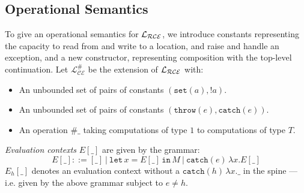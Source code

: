 \documentclass{eptcs}
\newcommand{\throw}{{\mathtt{throw}}}
\newcommand{\set}{{\mathtt{set}}}
\newcommand{\lett}{{\mathtt{let}}}
\newcommand{\spc}{\hspace{2pt}}
\newcommand{\Lce}{{\cal{L_{RCE}}}}
\newcommand{\catch}{{\mathtt{catch}}}
\newcommand{\com}{{{1}}}
\newcommand{\inn}{{{\mathtt{in}}}}
\begin{document}
\subsection{Operational Semantics}
To give an operational semantics for $\Lce$, we introduce constants representing the capacity to read from and write to a location, and raise and handle an exception, and  a new constructor, representing composition with the top-level continuation. 
Let ${\mathcal{L_{CE}^{\#}}}$ be the extension of $\Lce$ with:
\begin{itemize}
\item An unbounded set of pairs of constants $(\set(a),!a)$.
\item An unbounded set of pairs of constants $(\throw(e),\catch(e))$. 
\item An operation $\#\_$ taking computations of type $\com$ to computations of type $T$. 


\end{itemize}
\emph{Evaluation contexts} $E[\_]$ are given by the grammar:
$$E[\_]::= [\_]\  |\ \lett\spc x = E[\_]\spc \inn \spc M\ |\  \catch(e)\spc \lambda x.E[\_]$$ 
$E_h[\_]$ denotes an evaluation context without a $\catch(h)\spc \lambda x.\_$  in the spine --- i.e. given by the above grammar subject to  $e \not =h$.  
\end{document}
